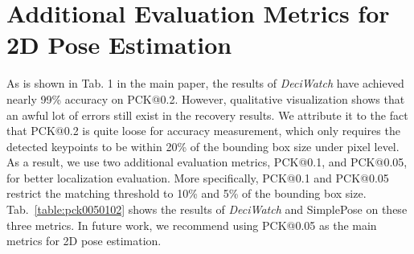 \documentclass[runningheads]{llncs}
\newcommand{\name}{\emph{DeciWatch}\xspace}
\begin{document}
\section{Additional Evaluation Metrics for 2D Pose Estimation}

As is shown in Tab. 1 in the main paper, the results of \name have achieved nearly 99\% accuracy on PCK@0.2. However, qualitative visualization shows that an awful lot of errors still exist in the recovery results. We attribute it to the fact that PCK@0.2 is quite loose for accuracy measurement, which only requires the detected keypoints to be within 20\% of the bounding box size under pixel level. As a result, we use two additional evaluation metrics, PCK@0.1, and PCK@0.05, for better localization evaluation. More specifically, PCK@0.1 and PCK@0.05 restrict the matching threshold to 10\% and 5\% of the bounding box size. Tab.~\ref{table:pck0050102} shows the results of \name and SimplePose\cite{xiao2018simple} on these three metrics. In future work, we recommend using PCK@0.05 as the main metrics for 2D pose estimation.
 
\begin{table}[H]
\centering
\caption{\textbf{Comparison of \name and SimplePose\cite{xiao2018simple} on PCK@0.2, PCK@0.1, and PCK@0.05}. In future work, we recommend using PCK@0.05 as the main metrics for 2D pose estimation.}
\label{table:pck0050102}

\end{table}
\end{document}
